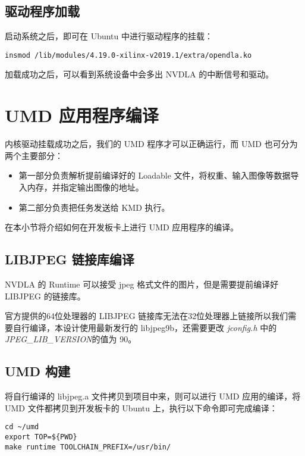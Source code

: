 \subsection{驱动程序加载}

启动系统之后，即可在 Ubuntu 中进行驱动程序的挂载：

\begin{lstlisting}
insmod /lib/modules/4.19.0-xilinx-v2019.1/extra/opendla.ko 
\end{lstlisting}

加载成功之后，可以看到系统设备中会多出 NVDLA 的中断信号和驱动。

\section{UMD 应用程序编译}

内核驱动挂载成功之后，我们的 UMD 程序才可以正确运行，而 UMD 也可分为两个主要部分：

\begin{itemize}
    \item 第一部分负责解析提前编译好的 Loadable 文件，将权重、输入图像等数据导入内存，并指定输出图像的地址。
    \item 第二部分负责把任务发送给 KMD 执行。
\end{itemize}

在本小节将介绍如何在开发板卡上进行 UMD 应用程序的编译。

\subsection{LIBJPEG 链接库编译}

NVDLA 的 Runtime 可以接受 jpeg 格式文件的图片，但是需要提前编译好 LIBJPEG 的链接库。

官方提供的64位处理器的 LIBJPEG 链接库无法在32位处理器上链接所以我们需要自行编译，本设计使用最新发行的 libjpeg9b，还需要更改 \emph{jconfig.h} 中的 \emph{JPEG\_LIB\_VERSION}的值为 90。

\subsection{UMD 构建}

将自行编译的 libjpeg.a 文件拷贝到项目中来，则可以进行 UMD 应用的编译，将 UMD 文件都拷贝到开发板卡的 Ubuntu 上，执行以下命令即可完成编译：

\begin{lstlisting}
cd ~/umd
export TOP=${PWD}
make runtime TOOLCHAIN_PREFIX=/usr/bin/
\end{lstlisting}

